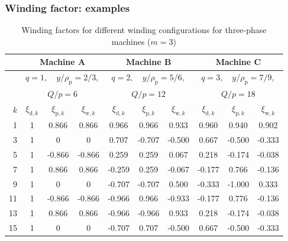\begin{frame}
	\frametitle{Winding factor: examples}
    \begin{table}
        \centering
        \begin{tabular}{r c c c c c c c c c}
            & \multicolumn{3}{c}{Machine A} & \multicolumn{3}{c}{Machine B} & \multicolumn{3}{c}{Machine C}\\
            \toprule
            & \multicolumn{3}{c}{$q=1, \quad y/\rho_\mathrm{p}=2/3,$} & \multicolumn{3}{c}{$q=2, \quad y/\rho_\mathrm{p}=5/6,$} & \multicolumn{3}{c}{$q=3, \quad y/\rho_\mathrm{p}=7/9,$}\\
            & \multicolumn{3}{c}{$Q/p = 6$} & \multicolumn{3}{c}{$Q/p = 12$} &\multicolumn{3}{c}{$Q/p = 18$}\\
            \cmidrule{2-10}
            $k$ & $\xi_{\mathrm{d},k}$ & $\xi_{\mathrm{p},k}$ & $\xi_{\mathrm{w},k}$ & $\xi_{\mathrm{d},k}$ & $\xi_{\mathrm{p},k}$ & $\xi_{\mathrm{w},k}$ & $\xi_{\mathrm{d},k}$ & $\xi_{\mathrm{p},k}$ & $\xi_{\mathrm{w},k}$\\
            \midrule
            1 & 1 & 0.866 & 0.866 & 0.966 & 0.966 & 0.933 & 0.960 & 0.940 & 0.902\\
            3 & 1 & 0 & 0 & 0.707 & -0.707 & -0.500 & 0.667 & -0.500 & -0.333\\
            5 & 1 & -0.866 & -0.866 & 0.259 & 0.259 & 0.067 & 0.218 & -0.174 & -0.038\\
            7 & 1 & 0.866 & 0.866 & -0.259 & 0.259 & -0.067 & -0.177 & 0.766 & -0.136\\
            9 & 1 & 0 & 0 & -0.707 & -0.707 & 0.500 & -0.333 & -1.000 & 0.333\\
            11 & 1 & -0.866 & -0.866 & -0.966 & 0.966 & -0.933 & -0.177 & 0.776 & -0.136\\
            13 & 1 & 0.866 & 0.866 & -0.966 & -0.966 & 0.933 & 0.218 & -0.174 & -0.038\\
            15 & 1 & 0 & 0 & -0.707 & 0.707 & -0.500 & 0.667 & -0.500 & -0.333\\
            \bottomrule
        \end{tabular}
        \caption{Winding factors for different winding configurations for three-phase machines ($m=3$)}
        \label{tab:Winding_factors}
    \end{table}
\end{frame}

